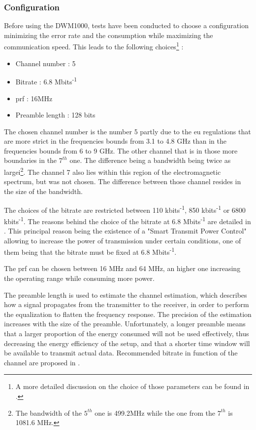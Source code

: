 \subsubsection{Configuration}

Before using the DWM1000, tests have been conducted to choose a configuration minimizing the error rate and the consumption while maximizing the communication speed. This leads to the following choices\footnote{A more detailed discussion on the choice of those parameters can be found in \cite{hannotier2019indoor}.} :

\begin{itemize}
\item Channel number : 5
\item Bitrate : 6.8 Mbits\textsuperscript{-1}
\item \gls{prf} : 16MHz
\item Preamble length : 128 bits
\end{itemize}

The chosen channel number is the number 5 partly due to the \gls{eu} regulations that are more strict in the frequencies bounds from 3.1 to 4.8 GHz than in the frequencies bounds from 6 to 9 GHz\cite{eulaw}. The other channel that is in those more  boundaries in the $7^{th}$ one. The difference being a bandwidth being twice as largei\footnote{The bandwidth of the $5^{th}$ one is 499.2MHz while the one from the $7^{th}$ is 1081.6 MHz.}. The channel 7 also lies within this region of the electromagnetic spectrum, but was not chosen. The difference between those channel resides in the size of the bandwidth.
\vspace{2mm}

The choices of the bitrate are restricted between 110 kbits\textsuperscript{-1}, 850 kbits\textsuperscript{-1} or 6800 kbits\textsuperscript{-1}. The reasons behind the choice of the bitrate at 6.8 Mbits\textsuperscript{-1} are detailed in \cite{hannotier2019indoor}. This principal reason being the existence of a "Smart Transmit Power Control" allowing to increase the power of transmission under certain conditions, one of them being that the bitrate must be fixed at 6.8 Mbits\textsuperscript{-1}.
\vspace{2mm}

The \gls{prf} can be chosen between 16 MHz and 64 MHz, an higher one increasing the operating range while consuming more power.
\vspace{2mm}

The preamble length is used to estimate the channel estimation, which describes how a signal propagates from the transmitter to the receiver, in order to perform the equalization to flatten the frequency response. The precision of the estimation increases with the size of the preamble. Unfortunately, a longer preamble means that a larger proportion of the energy consumed will not be used effectively, thus decreasing the energy efficiency of the setup, and that a shorter time window will be available to transmit actual data.  Recommended bitrate in function of the channel are proposed in \cite{usermanual}.
\vspace{2mm}

